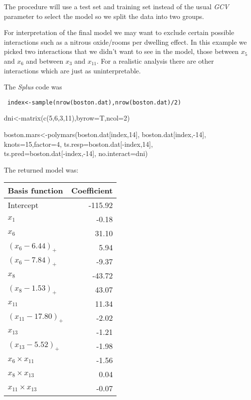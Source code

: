 The procedure will use a test set and training set instead of the usual
{\em GCV} parameter to select the model so we split the data into two
groups.

For interpretation of the final model we may want to exclude certain
possible interactions such as a nitrous oxide/rooms per dwelling effect.
In this example we picked two interactions that
we didn't want to see in the model, those between $x_5$ and $x_6$ and
between $x_3$ and $x_{11}$. For a realistic analysis there are other
interactions which are just as uninterpretable.


\noindent
The {\it Splus} code was\\
{\tt 
index<-sample(nrow(boston.dat),nrow(boston.dat)/2)

\noindent
dni<-matrix(c(5,6,3,11),byrow=T,ncol=2)

\noindent
boston.mars<-polymars(boston.dat[index,14], boston.dat[index,-14],\\
\hspace*{2in}knots=15,factor=4, ts.resp=boston.dat[-index,14],\\
\hspace*{2in}ts.pred=boston.dat[-index,-14], no.interact=dni)
}

\noindent
The returned model was:

\begin{tabular}{lr}\hline
Basis function           & Coefficient \\\hline
Intercept                & -115.92\\
$x_1$                    & -0.18\\
$x_6$                    & 31.10\\
$(x_6-6.44)_+$           & 5.94\\
$(x_6-7.84)_+$           &-9.37\\
$x_8$                    &-43.72\\
$(x_8-1.53)_+$           &43.07\\
$x_{11}$                   &11.34\\
$(x_{11}-17.80)_+$         &-2.02\\
$x_{13}$                   &-1.21\\
$(x_{13}-5.52)_+$          &-1.98\\
$x_6\times x_{11}$        &-1.56\\
$x_8\times x_{13}$        &0.04\\
$x_{11}\times x_{13}$       &-0.07\\
\hline
\end{tabular}

